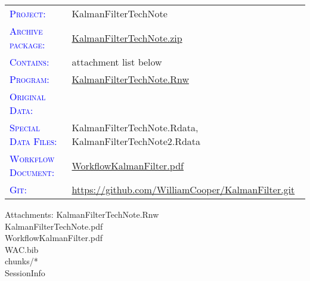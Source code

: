 \documentclass[12pt,twoside,english,12pt,twoside,english]{article}\usepackage[]{graphicx}\usepackage[]{color}
\providecommand{\tabularnewline}{\\}
\let\OrgIndex\index
\renewcommand*{\index}[1]{\OrgIndex{#1}}
\newenvironment{lylist}[1]{\begin{list}{}
{\settowidth{\labelwidth}{#1}
\setlength{\leftmargin}{\labelwidth}
\addtolength{\leftmargin}{\labelsep}
\renewcommand{\makelabel}[1]{##1\hfil}}}{\end{list}}
\newcommand{\attachm}[1]{\begin{lylist}{Attachments:00}
\item [Attachments:] {#1}
\end{lylist}}
\begin{document}
\begin{tabular}{ll}
\textsf{\textsc{\textcolor{blue}{Project:}}}  &
KalmanFilterTechNote\tabularnewline
\textsf{\textsc{\textcolor{blue}{Archive package:}}}  &
\href{https://github.com/WilliamCooper/KalmanFilter/blob/master/KalmanFilterTechNote.zip}{KalmanFilterTechNote.zip}\tabularnewline
\textsf{\textsc{\textcolor{blue}{Contains:}}}  &
attachment list below\tabularnewline
\textsf{\textsc{\textcolor{blue}{Program:}}}  &
\href{https://github.com/WilliamCooper/KalmanFilter/blob/master/KalmanFilterTechNote.Rnw}{KalmanFilterTechNote.Rnw}\tabularnewline
\textsf{\textsc{\textcolor{blue}{Original Data:}}}  &
\citet{EOL_DEEPWAVE-_2015}\index{DEEPWAVE research project} \tabularnewline
\textsf{\textsc{\textcolor{blue}{Special Data Files:}}}  &
KalmanFilterTechNote.Rdata, KalmanFilterTechNote2.Rdata\tabularnewline
\textsf{\textsc{\textcolor{blue}{Workflow Document:}}}  &
\href{https://github.com/WilliamCooper/KalmanFilter/blob/master/WorkflowKalmanFilter.pdf}{WorkflowKalmanFilter.pdf}\tabularnewline
\textsf{\textsc{\textcolor{blue}{Git:}}}  &
\index{GitHub repository}\href{https://github.com/WilliamCooper/KalmanFilter.git}{https://github.com/WilliamCooper/KalmanFilter.git}\tabularnewline
\end{tabular}

\attachm{KalmanFilterTechNote.Rnw\\
KalmanFilterTechNote.pdf\\
WorkflowKalmanFilter.pdf\\
WAC.bib\\
chunks/{*}\\
SessionInfo}

\clearpage
{} {}

\printindex[lis]{}

\clearpage
{} {}

\printindex[var]{}

\clearpage
{} {}

\printindex[idx]{}

\clearpage
{} {}

\label{sec:bibliography} 



\vfill\eject
\clearpage
{}
\end{document}
